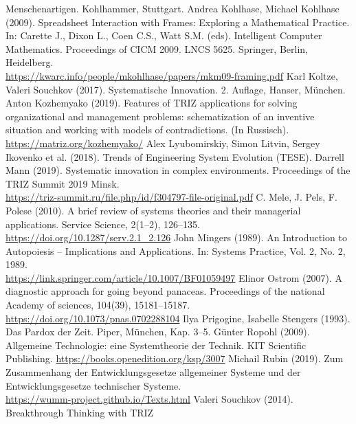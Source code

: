 \documentclass[11pt,a4paper]{article}
\begin{document}
\begin{thebibliography}{xxx}
  Menschenartigen.  Kohlhammer, Stuttgart.
 Andrea Kohlhase, Michael Kohlhase (2009). Spreadsheet
  Interaction with Frames: Exploring a Mathematical Practice. In: Carette J.,
  Dixon L., Coen C.S., Watt S.M. (eds). Intelligent Computer
  Mathematics. Proceedings of CICM 2009.  LNCS 5625. Springer, Berlin,
  Heidelberg.\\
  \url{https://kwarc.info/people/mkohlhase/papers/mkm09-framing.pdf}
 Karl Koltze, Valeri Souchkov (2017). Systematische
  Innovation.  2. Auf\-lage, Hanser, München.
 Anton Kozhemyako (2019). Features of TRIZ
  applications for solving organizational and management problems:
  schematization of an inventive situation and working with models of
  contradictions. (In Russisch).\\ \url{https://matriz.org/kozhemyako/}
 Alex Lyubomirskiy, Simon Litvin, Sergey Ikovenko et al.
  (2018).  Trends of Engineering System Evolution (TESE).
 Darrell Mann (2019).  Systematic innovation in complex
  environments. Proceedings of the TRIZ Summit 2019 Minsk.\\
  \url{https://triz-summit.ru/file.php/id/f304797-file-original.pdf} 
 C. Mele, J. Pels, F. Polese (2010). A brief review of
  systems theories and their managerial applications. Service Science,
  2(1--2), 126--135.\\ \url{https://doi.org/10.1287/serv.2.1_2.126} 
 John Mingers (1989). An Introduction to Autopoiesis --
  Implications and Applications. In: Systems Practice, Vol. 2, No. 2,
  1989.\\ \url{https://link.springer.com/article/10.1007/BF01059497}
 Elinor Ostrom (2007). A diagnostic approach for going
  beyond panaceas.  Proceedings of the national Academy of sciences, 104(39),
  15181--15187.\\ \url{https://doi.org/10.1073/pnas.0702288104}
 Ilya Prigogine, Isabelle Stengers (1993). Das Pardox
  der Zeit. Piper, München, Kap. 3--5.
 Günter Ropohl (2009). Allgemeine Technologie: eine
  Systemtheorie der Technik.  KIT Scientific Publishing.
  \url{https://books.openedition.org/ksp/3007}
 Michail Rubin (2019).  Zum Zusammenhang der
  Entwicklungsgesetze allgemeiner Systeme und der Entwicklungsgesetze
  technischer Systeme. \\ \url{https://wumm-project.github.io/Texts.html}
 Valeri Souchkov (2014). Breakthrough Thinking with TRIZ

\end{thebibliography}
\end{document}
